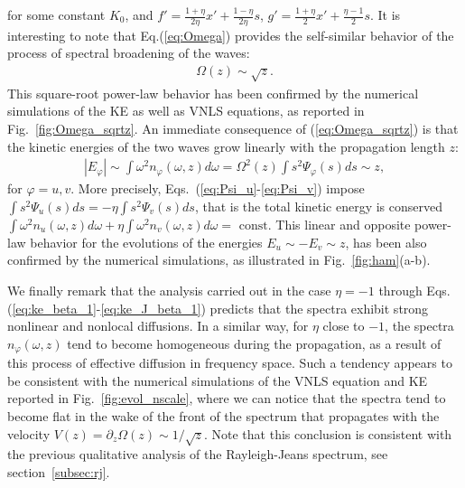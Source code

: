 \documentclass[pra,twocolumn,showpacs,preprintnumbers,amsmath,amssymb]{revtex4}
\begin{document}
for some constant $K_0$, and
$f' = \frac{1+\eta}{2\eta} x'+\frac{1-\eta}{2\eta}s$, 
$g' = \frac{1+\eta}{2} x'+\frac{\eta-1}{2}s$.
It is interesting to note that Eq.(\ref{eq:Omega}) provides the self-similar behavior of the process of spectral broadening of the waves:
\begin{eqnarray}
\Omega(z) \sim \sqrt{z}.
\label{eq:Omega_sqrtz}
\end{eqnarray}
This square-root power-law behavior has been confirmed by the numerical simulations of the KE as well as VNLS equations, as reported in Fig.~\ref{fig:Omega_sqrtz}.
An immediate consequence of (\ref{eq:Omega_sqrtz}) is that the kinetic energies of the two waves  grow linearly with the propagation length $z$:
\begin{eqnarray}
|E_\varphi| \sim \int \omega^2 n_\varphi(\omega,z) d\omega =   \Omega^2(z) \int s^2 \Psi_\varphi(s) ds  \sim  z,
\label{eq:kin_en_z}
\end{eqnarray}
for $\varphi=u,v$.
More precisely, Eqs.~(\ref{eq:Psi_u}-\ref{eq:Psi_v}) impose $\int s^2 \Psi_u(s) ds = - \eta \int s^2 \Psi_v(s) ds$, that is the total kinetic energy is conserved $\int \omega^2 n_u(\omega,z) d\omega +\eta \int \omega^2 n_v(\omega,z) d\omega = \mbox{ const}$.
This linear and opposite power-law behavior for the evolutions of the energies $E_u \sim -E_v \sim z$,  has been also confirmed by the numerical simulations, as illustrated in Fig.~\ref{fig:ham}(a-b).

We finally remark that the analysis carried out in the case $\eta=-1$ through Eqs.(\ref{eq:ke_beta_1}-\ref{eq:ke_J_beta_1}) predicts that the spectra exhibit strong nonlinear and nonlocal diffusions. 
In a similar way, for $\eta$ close to $-1$, the spectra $n_\varphi(\omega,z)$ tend to become homogeneous during the propagation, as a result of this process of effective diffusion in frequency space. 
Such a tendency appears to be consistent with the numerical simulations of the VNLS equation and KE reported in Fig.~\ref{fig:evol_nscale}, where we can notice that the spectra tend to become flat in the wake of the front of the spectrum that propagates with the velocity $V(z) = \partial_z \Omega(z) \sim 1/\sqrt{z}$.
Note that this conclusion is consistent with the previous qualitative analysis of the Rayleigh-Jeans spectrum, see section~\ref{subsec:rj}.
\end{document}
